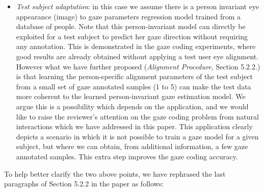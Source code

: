 {\begin{itemize}
\item {\em Test subject adaptation}: in this case we assume there is a person invariant eye appearance (image) to gaze parameters regression model
trained from a database of people.
%
Note that this person-invariant model can directly be exploited for a test subject to predict her gaze direction without requiring any annotation.
%
This is demonstrated in the gaze coding experiments, where good results are already obtained without applying a  test user eye alignment.
%
However what we have further proposed ({\em Alignment Procedure}, Section 5.2.2.) is that learning the person-specific alignment
parameters of the test subject from a small set of gaze annotated samples (1 to 5) can make the test data
more coherent to the learned person-invariant gaze estimation model.
%
We argue this is a possibility which depends on the application, and  we would like to raise the reviewer's attention on
the gaze coding problem from natural interactions which we have addressed in this paper.
%
This application clearly depicts a scenario in which it is not possible to train a gaze model for a given subject,
 but where we can obtain, from additional information, a few gaze annotated samples. This extra step improves the gaze coding accuracy.
\end{itemize}

\qquad

To help better clarify the two above points, we have rephrased the last paragraphs of  Section 5.2.2 in the paper as follows:

}
